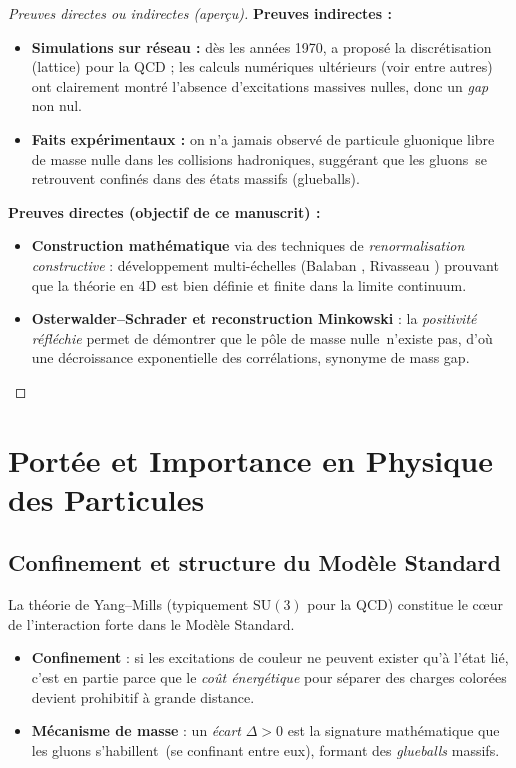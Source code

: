 \begin{proof}[Preuves directes ou indirectes (aperçu)]
	\textbf{Preuves indirectes :}
	\begin{itemize}
		\item \textbf{Simulations sur réseau :} dès les années 1970, \cite{Wilson1974} a proposé la discrétisation (lattice) pour la QCD ; les calculs numériques ultérieurs (voir \cite{Creutz1980} entre autres) ont clairement montré l’absence d’excitations massives nulles, donc un \emph{gap} non nul.
		\item \textbf{Faits expérimentaux :} on n’a jamais observé de particule gluonique libre de masse nulle dans les collisions hadroniques, suggérant que les \og gluons\fg\ se retrouvent confinés dans des états massifs (glueballs).
	\end{itemize}
	
	\textbf{Preuves directes (objectif de ce manuscrit) :}
	\begin{itemize}
		\item \textbf{Construction mathématique} via des techniques de \emph{renormalisation constructive} : développement multi-échelles (Balaban \cite{Balaban1982-1,Balaban1982-2}, Rivasseau \cite{Rivasseau1991}) prouvant que la théorie en 4D est bien définie et finite dans la limite continuum.
		\item \textbf{Osterwalder--Schrader et reconstruction Minkowski} : la \textit{positivité réfléchie} permet de démontrer que le \og pôle de masse nulle\fg\ n’existe pas, d’où une décroissance exponentielle des corrélations, synonyme de mass gap.
	\end{itemize}
\end{proof}

\section{Portée et Importance en Physique des Particules}
\label{sec:1.2}

\subsection*{Confinement et structure du Modèle Standard}
La théorie de Yang--Mills (typiquement \(\mathrm{SU}(3)\) pour la QCD) constitue le cœur de l’interaction forte dans le Modèle Standard. 
\begin{itemize}
	\item \textbf{Confinement} : si les excitations de couleur ne peuvent exister qu’à l’état lié, c’est en partie parce que le \emph{coût énergétique} pour séparer des charges colorées devient prohibitif à grande distance.  
	\item \textbf{Mécanisme de masse} : un \emph{écart} \(\Delta > 0\) est la signature mathématique que les gluons \og s’habillent\fg\ (se confinant entre eux), formant des \emph{glueballs} massifs.
\end{itemize}

